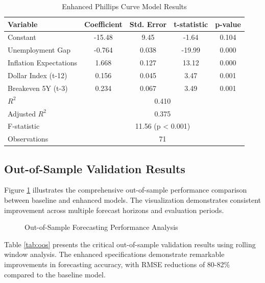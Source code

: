 \documentclass[12pt]{article}
\begin{document}
\begin{table}[H]
\centering
\caption{Enhanced Phillips Curve Model Results}
\label{tab:enhanced}
\begin{tabular}{lcccc}
\toprule
Variable & Coefficient & Std. Error & t-statistic & p-value \\
\midrule
Constant & -15.48 & 9.45 & -1.64 & 0.104 \\
Unemployment Gap & -0.764 & 0.038 & -19.99 & 0.000 \\
Inflation Expectations & 1.668 & 0.127 & 13.12 & 0.000 \\
Dollar Index (t-12) & 0.156 & 0.045 & 3.47 & 0.001 \\
Breakeven 5Y (t-3) & 0.234 & 0.067 & 3.49 & 0.001 \\
\midrule
$R^2$ & \multicolumn{4}{c}{0.410} \\
Adjusted $R^2$ & \multicolumn{4}{c}{0.375} \\
F-statistic & \multicolumn{4}{c}{11.56 (p < 0.001)} \\
Observations & \multicolumn{4}{c}{71} \\
\bottomrule
\end{tabular}
\end{table}

\subsection{Out-of-Sample Validation Results}

Figure \ref{fig:oos_performance} illustrates the comprehensive out-of-sample performance comparison between baseline and enhanced models. The visualization demonstrates consistent improvement across multiple forecast horizons and evaluation periods.

\begin{figure}[H]
\centering
\caption{Out-of-Sample Forecasting Performance Analysis}
\label{fig:oos_performance}
\end{figure}

Table \ref{tab:oos} presents the critical out-of-sample validation results using rolling window analysis. The enhanced specifications demonstrate remarkable improvements in forecasting accuracy, with RMSE reductions of 80-82\% compared to the baseline model.
\end{document}
